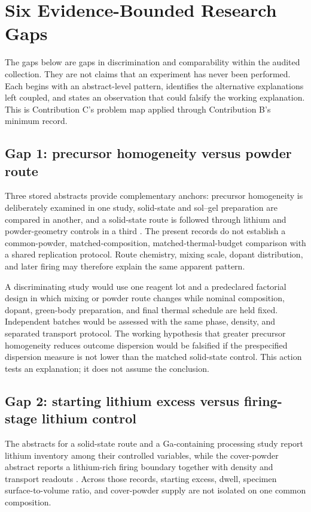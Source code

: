 \section{Six Evidence-Bounded Research Gaps}

The gaps below are gaps in discrimination and comparability within the audited collection. They are not claims that an experiment has never been performed. Each begins with an abstract-level pattern, identifies the alternative explanations left coupled, and states an observation that could falsify the working explanation. This is Contribution C's problem map applied through Contribution B's minimum record.

\subsection{Gap 1: precursor homogeneity versus powder route}

Three stored abstracts provide complementary anchors: precursor homogeneity is deliberately examined in one study, solid-state and sol--gel preparation are compared in another, and a solid-state route is followed through lithium and powder-geometry controls in a third \cite{parascos2022compositional,kosir2022comparative,heywood2023tailoring}. The present records do not establish a common-powder, matched-composition, matched-thermal-budget comparison with a shared replication protocol. Route chemistry, mixing scale, dopant distribution, and later firing may therefore explain the same apparent pattern.

A discriminating study would use one reagent lot and a predeclared factorial design in which mixing or powder route changes while nominal composition, dopant, green-body preparation, and final thermal schedule are held fixed. Independent batches would be assessed with the same phase, density, and separated transport protocol. The working hypothesis that greater precursor homogeneity reduces outcome dispersion would be falsified if the prespecified dispersion measure is not lower than the matched solid-state control. This action tests an explanation; it does not assume the conclusion.

\subsection{Gap 2: starting lithium excess versus firing-stage lithium control}

The abstracts for a solid-state route and a Ga-containing processing study report lithium inventory among their controlled variables, while the cover-powder abstract reports a lithium-rich firing boundary together with density and transport readouts \cite{heywood2023tailoring,schwab2023towards,zhang2019densification}. Across those records, starting excess, dwell, specimen surface-to-volume ratio, and cover-powder supply are not isolated on one common composition.

